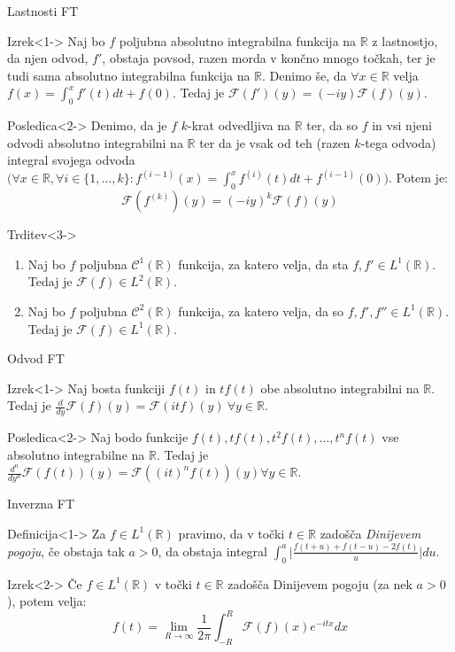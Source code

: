 \documentclass[t, 8pt]{beamer} %
\newcommand{\abs}[1]{\ensuremath{\lvert #1 \rvert}}
\newcommand{\mth}[1]{\ensuremath{\mathbb{#1}}}
\newcommand{\R}{\mth{R}}
\newcommand{\pojem}[1]{\emph{#1}}
\newcommand{\fillblack}[1]{
	\begin{tikzpicture}[remember picture, overlay]
		\node [shift={(0 cm,0cm)}]  at (current page.south west)
		{%
			\begin{tikzpicture}[remember picture, overlay] at (current page.south west)
				\draw [fill=black] (0, 0) -- (0,#1 \paperheight) --
				(\paperwidth,#1 \paperheight) -- (\paperwidth,0) -- cycle ;
			\end{tikzpicture}
		};
		\draw (current page.north west) rectangle (current page.south east);
	\end{tikzpicture}
}
\begin{document}
		\begin{frame}{Lastnosti FT}
			\begin{block}{Izrek}<1->
				Naj bo $f$ poljubna absolutno integrabilna funkcija na $\R$ z lastnostjo, da njen odvod, $f'$, obstaja povsod, razen morda v končno mnogo točkah, ter je tudi sama absolutno integrabilna funkcija na $\R$. Denimo še, da $\forall x\in \R$ velja $f(x) = \int_0^x f'(t)dt + f(0)$. Tedaj je $\mathcal{F}(f')(y) = (-iy)\mathcal{F}(f)(y)$.
			\end{block}
			\begin{block}{Posledica}<2->
				Denimo, da je $f$ $k$-krat odvedljiva na $\R$ ter, da so $f$ in vsi njeni odvodi absolutno integrabilni na $\R$ ter da je vsak od teh (razen $k$-tega odvoda) integral svojega odvoda $\big(\forall x\in\R, \forall i\in \{1, \ldots, k\}: f^{(i-1)}(x) = \int_{0}^{x}f^{(i)}(t)dt + f^{(i-1)}(0)\big)$. Potem je: $$\mathcal{F}(f^{(k)})(y) = (-iy)^k\mathcal{F}(f)(y)$$
			\end{block}
			\begin{block}{Trditev}<3->
				\begin{enumerate}
					\item Naj bo $f$ poljubna $\mathcal{C}^1(\R)$ funkcija, za katero velja, da sta $f, f'\in L^1(\R)$. Tedaj je $\mathcal{F}(f) \in L^2(\R)$.
					\item Naj bo $f$ poljubna $\mathcal{C}^2(\R)$ funkcija, za katero velja, da so $f, f', f''\in L^1(\R)$. Tedaj je $\mathcal{F}(f) \in L^1(\R)$.
				\end{enumerate}
			\end{block}
		\end{frame}
		
		\begin{frame}{Odvod FT}
			\begin{block}{Izrek}<1->
				Naj bosta funkciji $f(t)$ in $tf(t)$ obe absolutno integrabilni na $\R$. Tedaj je $\frac{d}{dy}\mathcal{F}(f)(y) = \mathcal{F}(itf)(y)~\forall y\in\R$.
			\end{block}
			\begin{block}{Posledica}<2->
				Naj bodo funkcije $f(t), tf(t), t^2f(t), \ldots, t^nf(t)$ vse absolutno integrabilne na $\R$. Tedaj je $\frac{d^n}{dy^n}\mathcal{F}(f(t))(y) = \mathcal{F}((it)^nf(t))(y) \forall y\in \R$.
			\end{block}
		\end{frame}
		
		\begin{frame}{Inverzna FT}
			\begin{block}{Definicija}<1->
				Za $f\in L^1(\R)$ pravimo, da v točki $t\in\R$ zadošča \pojem{Dinijevem pogoju}, če obstaja tak $a>0$, da obstaja integral $\int_{0}^a \abs{\frac{f(t+u) + f(t-u) - 2f(t)}{u}}du$.
			\end{block}
			\begin{block}{Izrek}<2->
					Če $f\in L^1(\R)$ v točki $t\in\R$ zadošča Dinijevem pogoju (za nek $a>0$), potem velja: $$f(t) = \lim_{R\to\infty}\frac{1}{2\pi}\int_{-R}^{R}\mathcal{F}(f)(x)e^{-itx} dx$$
			\end{block}
		\end{frame}
		
\end{document}
